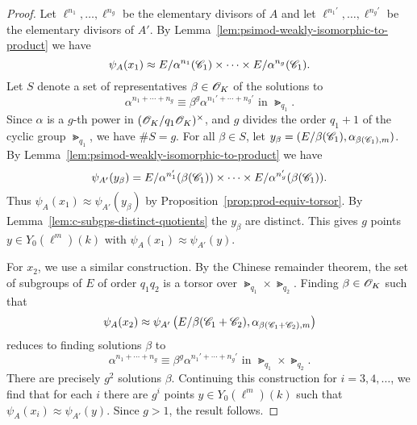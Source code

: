 \documentclass{amsart}
\begin{document}
\begin{proof}
Let $\ell^{n_1},\dots,\ell^{n_g}$ be the elementary divisors of $A$  and let $\ell^{n_1'},\dots,\ell^{n_g'}$ be the elementary divisors of $A'$.
By Lemma~\ref{lem:psimod-weakly-isomorphic-to-product} we have $$\psi_{A}(x_1) \approx E/\alpha^{n_1}(\mathscr{C}_1) \times \cdots \times E/\alpha^{n_g}(\mathscr{C}_1).$$
    Let $S$ denote a set of representatives $\beta \in \mathscr{O}_K$ of the solutions to %
    \[
      \alpha^{n_1 + \cdots + n_g} \equiv \beta^g\alpha^{n_1' + \cdots + n_g'}
      \text{ in } \Gt_{q_1}.
    \]
Since $\alpha$ is a $g$-th power in  $(\mathscr{O}_K/q_1\mathscr{O}_K)^\times$, and  $g$ divides the order $q_1 + 1$ of the cyclic group $\Gt_{q_1}$,
   we have $\#S = g$. For all $\beta \in S$, let $y_\beta = (E/\beta(\mathscr{C}_1),\alpha_{\beta(\mathscr{C}_1),m})$. By Lemma~\ref{lem:psimod-weakly-isomorphic-to-product} we have $$\psi_{A'}(y_\beta) = E/\alpha^{n_1'}(\beta(\mathscr{C}_1)) \times \cdots \times E/\alpha^{n_g'}(\beta(\mathscr{C}_1)).$$ Thus $\psi_A(x_1) \approx \psi_{A'}(y_\beta)$ by Proposition~\ref{prop:prod-equiv-torsor}. By Lemma~\ref{lem:c-subgps-distinct-quotients} the $y_\beta$ are distinct. This gives $g$ points $y \in Y_0(\ell^m)(k)$ with $\psi_{A}(x_1) \approx \psi_{A'}(y)$.

  For $x_2$, we use a similar construction. By the Chinese remainder theorem, the set of subgroups of $E$ of order $q_1q_2$ is a torsor over $\Gt_{q_1} \times \Gt_{q_2}$. Finding $\beta \in \mathscr{O}_K$ such that
  \[
    \psi_{A}(x_2) \approx \psi_{A'}\left(E/\beta(\mathscr{C}_1+\mathscr{C}_2),\alpha_{\beta(\mathscr{C}_1+\mathscr{C}_2),m}\right)
  \]
  reduces to finding solutions $\beta$ to %
  \[
    \alpha^{n_1 + \cdots + n_g} \equiv \beta^g\alpha^{n_1' + \cdots + n_g'}
    \text{ in } \Gt_{q_1} \times \Gt_{q_2}.
  \]
There are precisely $g^2$ solutions $\beta$. Continuing this construction for $i=3,4,\dots$, we find that for each $i$ there are $g^i$ points $y \in Y_0(\ell^m)(k)$ such that $\psi_{A}(x_i) \approx \psi_{A'}(y)$. Since $g > 1$, the result follows.
\end{proof}
\end{document}
